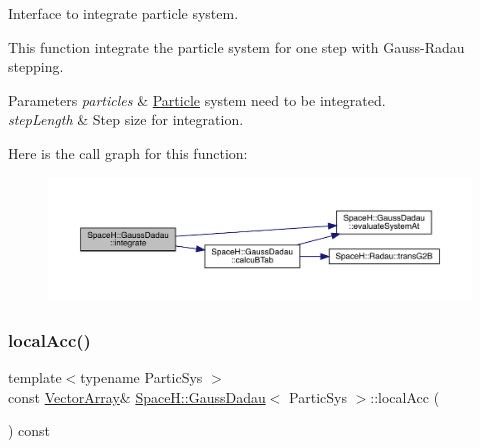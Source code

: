 Interface to integrate particle system. 

This function integrate the particle system for one step with Gauss-\/\+Radau stepping. 
\begin{DoxyParams}{Parameters}
{\em particles} & \mbox{\hyperlink{struct_space_h_1_1_particle}{Particle}} system need to be integrated. \\
\hline
{\em step\+Length} & Step size for integration. \\
\hline
\end{DoxyParams}
Here is the call graph for this function\+:
\nopagebreak
\begin{figure}[H]
\begin{center}
\leavevmode
\includegraphics[width=350pt]{class_space_h_1_1_gauss_dadau_a5ce29f965ea0376d9fb3fddf116926b1_cgraph}
\end{center}
\end{figure}
\mbox{\label{class_space_h_1_1_gauss_dadau_a9e89b65584577e684033159d85aa1a9f}} 
\subsubsection{\texorpdfstring{local\+Acc()}{localAcc()}}
{\footnotesize\ttfamily template$<$typename Partic\+Sys $>$ \\
const \mbox{\hyperlink{class_space_h_1_1_gauss_dadau_a69e00c49f96f4ffeeb767bb7222834da}{Vector\+Array}}\& \mbox{\hyperlink{class_space_h_1_1_gauss_dadau}{Space\+H\+::\+Gauss\+Dadau}}$<$ Partic\+Sys $>$\+::local\+Acc (\begin{DoxyParamCaption}{ }\end{DoxyParamCaption}) const\hspace{0.3cm}{\ttfamily [inline]}}

\mbox{\label{class_space_h_1_1_gauss_dadau_a7669fef19d9982793fc4f4bbd49ad650}} 
